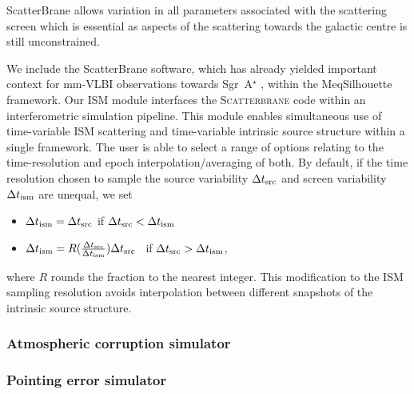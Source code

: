 {\sc ScatterBrane} allows variation in all parameters associated with the scattering screen which is essential as aspects of the scattering towards the galactic centre is still unconstrained. 



We include the {\sc ScatterBrane} software, which has already yielded important context for mm-VLBI observations towards Sgr~A$^\star$ \citep[e.g.][]{2016arXiv160106571O}, within the {\sc MeqSilhouette} framework. Our ISM module interfaces the \textsc{Scatterbrane} code within an interferometric simulation pipeline. This module enables simultaneous use of time-variable ISM scattering and time-variable intrinsic source structure within a single framework. The user is able to select a range of options relating to the time-resolution and epoch interpolation/averaging of both. By default, if the time resolution chosen to sample the source variability $\Delta t_{\rm src}$ and screen variability $\Delta t_{\rm ism}$ are unequal, we set  
\begin{itemize}
 \setlength\itemsep{1em}
\item $\Delta t_{\rm ism}=\Delta t_{\rm src}$ \qquad \qquad if \qquad  $\Delta t_{\rm src} < \Delta t_{\rm ism}$
\item $\Delta t_{\rm ism}=R(\frac{\Delta t_{\rm src}}{\Delta t_{\rm ism}})\Delta t_{\rm src}$ \ if \qquad  $\Delta t_{\rm src} > \Delta t_{\rm ism}$,
\end{itemize}
where $R$ rounds the fraction to the nearest integer.  This modification to the ISM sampling resolution avoids interpolation between different snapshots of the intrinsic source structure.


\subsubsection{Atmospheric corruption simulator}





\subsubsection{Pointing error simulator}
